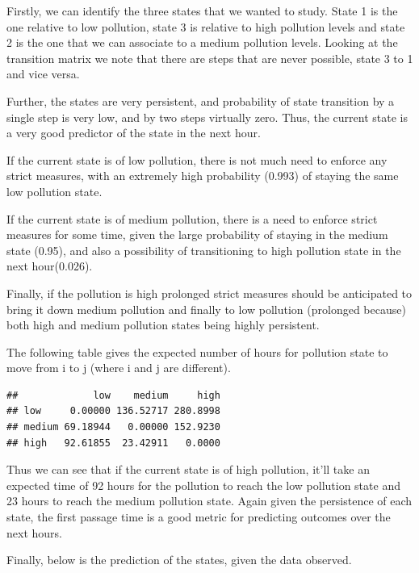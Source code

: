 \documentclass[
]{article}
\begin{document}
Firstly, we can identify the three states that we wanted to study. State
1 is the one relative to low pollution, state 3 is relative to high
pollution levels and state 2 is the one that we can associate to a
medium pollution levels. Looking at the transition matrix we note that
there are steps that are never possible, state 3 to 1 and vice versa.

Further, the states are very persistent, and probability of state
transition by a single step is very low, and by two steps virtually
zero. Thus, the current state is a very good predictor of the state in
the next hour.

If the current state is of low pollution, there is not much need to
enforce any strict measures, with an extremely high probability (0.993)
of staying the same low pollution state.

If the current state is of medium pollution, there is a need to enforce
strict measures for some time, given the large probability of staying in
the medium state (0.95), and also a possibility of transitioning to high
pollution state in the next hour(0.026).

Finally, if the pollution is high prolonged strict measures should be
anticipated to bring it down medium pollution and finally to low
pollution (prolonged because) both high and medium pollution states
being highly persistent.

The following table gives the expected number of hours for pollution
state to move from i to j (where i and j are different).

\begin{verbatim}
##             low    medium     high
## low     0.00000 136.52717 280.8998
## medium 69.18944   0.00000 152.9230
## high   92.61855  23.42911   0.0000
\end{verbatim}

Thus we can see that if the current state is of high pollution, it'll
take an expected time of 92 hours for the pollution to reach the low
pollution state and 23 hours to reach the medium pollution state. Again
given the persistence of each state, the first passage time is a good
metric for predicting outcomes over the next hours.

Finally, below is the prediction of the states, given the data observed.
\end{document}
